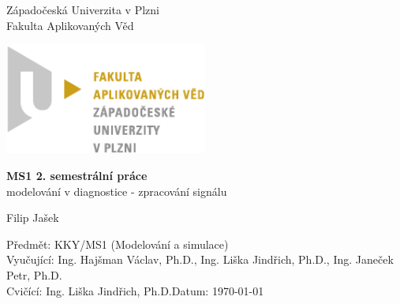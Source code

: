 \begin{titlepage}
    \begin{center}
        \LARGE
        Západočeská Univerzita v Plzni\\
        Fakulta Aplikovaných Věd\\
        
        \vspace{1cm}
        
        \includegraphics[width=0.5\textwidth]{./Graphics/FAV_logo.pdf}
        
        \vspace{4cm}
        
        \textbf{MS1 2. semestrální práce}\\
        modelování v diagnostice - zpracování signálu
        
        \vspace{0.5cm}
        Filip Jašek
        
    \end{center} 
    \vfill
        \noindent
        \large
        Předmět: KKY/MS1 (Modelování a simulace)\\
        Vyučující: Ing. Hajšman Václav, Ph.D., Ing. Liška Jindřich, Ph.D., Ing. Janeček Petr, Ph.D.\\
        Cvičící: Ing. Liška Jindřich, Ph.D.\hfill Datum: \today
\end{titlepage}